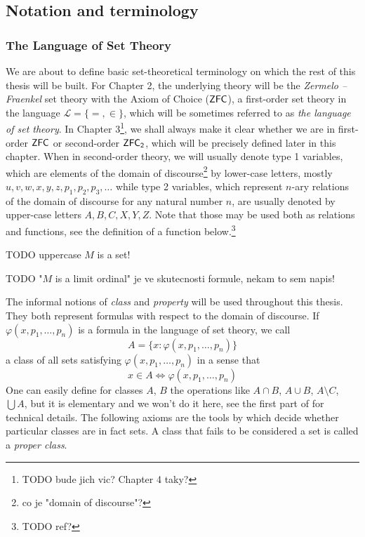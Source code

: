 \subsection{Notation and terminology}
\subsubsection{The Language of Set Theory}
% 

We are about to define basic set-theoretical terminology on which the rest of this thesis will be built. For Chapter 2, the underlying theory will be the \emph{Zermelo –Fraenkel} set theory with the Axiom of Choice ($\sf{ZFC}$), a first-order set theory in the language $\mathscr{L} = \{=, \in\}$, which will be sometimes referred to as \emph{the language of set theory}. In Chapter 3\footnote{TODO bude jich vic? Chapter 4 taky?}, we shall always make it clear whether we are in first-order $\sf{ZFC}$ or second-order $\sf{ZFC}_2$, which will be precisely defined later in this chapter. When in second-order theory, we will usually denote type 1 variables, which are elements of the domain of discourse\footnote{co je "domain of discourse"?} by lower-case letters, mostly $u, v, w, x, y, z, p_1, p_2, p_3,  \ldots$ while type 2 variables, which represent $n$-ary relations of the domain of discourse for any natural number $n$, are usually denoted by upper-case letters $A, B, C, X, Y, Z$. Note that those may be used both as relations and functions, see the definition of a function below.\footnote{TODO ref?}

TODO uppercase $M$ is a set!

TODO "$M$ is a limit ordinal" je ve skutecnosti formule, nekam to sem napis!

The informal notions of \emph{class} and \emph{property} will be used throughout this thesis. They both represent formulas with respect to the domain of discourse. If $\varphi(x, p_1, \ldots, p_n)$ is a formula in the language of set theory, we call 
\begin{equation}
A = \{x : \varphi(x, p_1, \ldots, p_n)\}
\end{equation}
a class of all sets satisfying $\varphi(x, p_1, \ldots, p_n)$ in a sense that 
\begin{equation}
x \in A \iff \varphi(x, p_1, \ldots, p_n)
\end{equation}
One can easily define for classes $A$, $B$ the operations like $A \cap B$, $A \cup B$, $A \setminus C$, $\bigcup A$, but it is elementary and we won't do it here, see the first part of \cite{JechBook} for technical details. The following axioms are the tools by which decide whether particular classes are in fact sets. A class that fails to be considered a set is called a \emph{proper class}.
\


